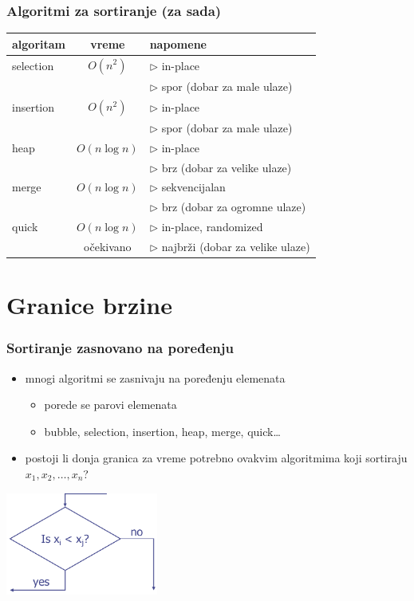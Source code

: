 \documentclass[compress]{beamer}
\begin{document}
\begin{frame}[fragile]
  \frametitle{Algoritmi za sortiranje (za sada)}
  \begin{tabular}{l|c|p{6cm}}
  \textbf{algoritam} & \textbf{vreme} & \textbf{napomene} \\ \hline\hline
  selection & $O(n^2)$ & $\rhd$ in-place \\ 
   &  & $\rhd$ spor (dobar za male ulaze) \\ \hline
  insertion & $O(n^2)$ & $\rhd$ in-place \\ 
   &  & $\rhd$ spor (dobar za male ulaze) \\ \hline
  heap & $O(n\log n)$ & $\rhd$ in-place \\
   &  & $\rhd$ brz (dobar za velike ulaze) \\ \hline
  merge & $O(n\log n)$ & $\rhd$ sekvencijalan \\
   &  & $\rhd$ brz (dobar za ogromne ulaze) \\ \hline
  quick & $O(n\log n)$ & $\rhd$ in-place, randomized \\
   & {\tiny očekivano} & $\rhd$ najbrži (dobar za velike ulaze) \\ \hline
  \end{tabular}
\end{frame}

\section[Granice brzine]{Granice brzine}

\begin{frame}[fragile]
  \frametitle{Sortiranje zasnovano na poređenju}
  \begin{itemize}
    \item mnogi algoritmi se zasnivaju na poređenju elemenata
    \begin{itemize}
      \item porede se parovi elemenata 
      \item bubble, selection, insertion, heap, merge, quick\ldots
    \end{itemize}
    \item postoji li donja granica za vreme potrebno ovakvim algoritmima koji sortiraju $x_1, x_2, \ldots, x_n$?
  \end{itemize}
  \begin{center}
    \includegraphics[width=5cm]{asp-12-pic28.png}
  \end{center}
\end{frame}
\end{document}

